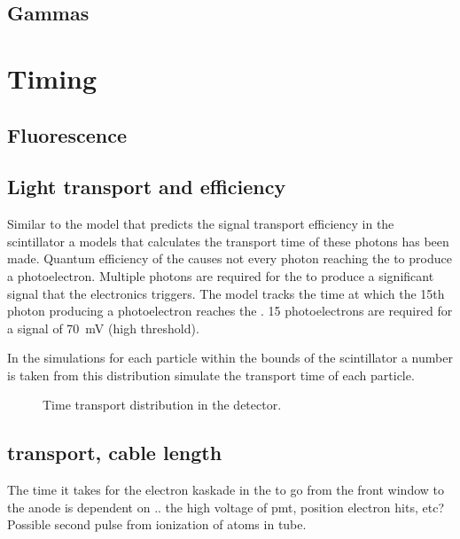 \subsection{Gammas}



\section{Timing}


\subsection{Fluorescence}



\subsection{Light transport and \pmt efficiency}

Similar to the model that predicts the signal transport efficiency in
the scintillator a models that calculates the transport time of these
photons has been made. Quantum efficiency of the \pmt causes not every
photon reaching the \pmt to produce a photoelectron. Multiple photons
are required for the \pmt to produce a significant signal that the
\hisparc electronics triggers. The model tracks the time at which the
15th photon producing a photoelectron reaches the \pmt. 15
photoelectrons are required for a signal of \SI{70}{\milli\volt} (high
threshold).

In the simulations for each particle within the bounds of the
scintillator a number is taken from this distribution simulate the
transport time of each particle.

\begin{figure}
    \centering
    
    \caption{ Time transport
             distribution in the detector.}
    \label{fig:transport_time}
\end{figure}


\subsection{\pmt transport, cable length}

The time it takes for the electron kaskade in the \pmt to go from the
front window to the anode is dependent on .. the high voltage of pmt,
position electron hits, etc? Possible second pulse from ionization of
atoms in tube.


